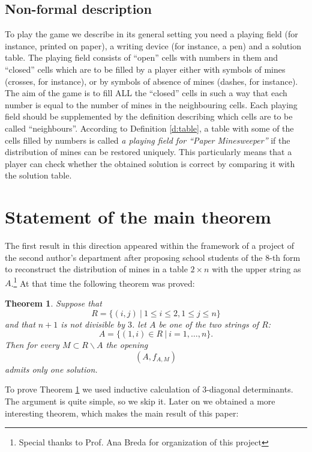 \documentclass[english,12pt]{article}
\newtheorem{theorem}{Theorem}
\theoremstyle{remark}
\theoremstyle{definition}
\theoremstyle{definition}
\begin{document}
\subsection{Non-formal description}
To play the game we describe in its general setting you need a
playing field (for instance, printed on paper), a writing device
(for instance, a pen) and a solution table. The playing field
consists of ``open'' cells with numbers in them and ``closed''
cells which are to be filled by a player either with symbols of
mines (crosses, for instance), or by symbols of absence of mines
(dashes, for instance). The aim of the game is to fill ALL the
``closed'' cells in such a way that each number is equal to the
number of mines in the neighbouring cells. Each playing field
should be supplemented by the definition describing which cells
are to be called ``neighbours''. According to Definition
\ref{d:table}, a table with some of the cells filled by numbers is
called \emph{a playing field for ``Paper Minesweeper''} if the
distribution of mines can be restored uniquely. This particularly
means that a player can check whether the obtained solution is
correct by comparing it with the solution table.



\section{Statement of the main theorem}

 The first result in this direction appeared within the framework
of a project of the second author's department after proposing school students of the $8$-th form
to reconstruct the distribution of mines in a table $2\times n$ with the upper string as
$A$.\footnote{Special thanks to Prof. Ana Breda for organization of this project} At that time the
following theorem was proved:

\begin{theorem} \label{t:2_times_n}
Suppose that
\[ R=\{(i,j)\ |\ 1 \leq i\leq 2, 1 \leq j \leq n \} \]
and that $n+1$ is not divisible by $3$. let $A$ be one of the two strings of $R$:
\[ A=\{ (1,i)\in R\ |\ i=1,\ldots,n \}. \]
Then for every $M\subset R\backslash A$ the opening
\[ (A,f_{A,M}) \]
admits only one solution.
\end{theorem}

To prove Theorem \ref{t:2_times_n} we used inductive calculation of $3$-diagonal determinants. The
argument is quite simple, so we skip it. Later on we obtained a more interesting theorem, which
makes the main result of this paper:
\end{document}
